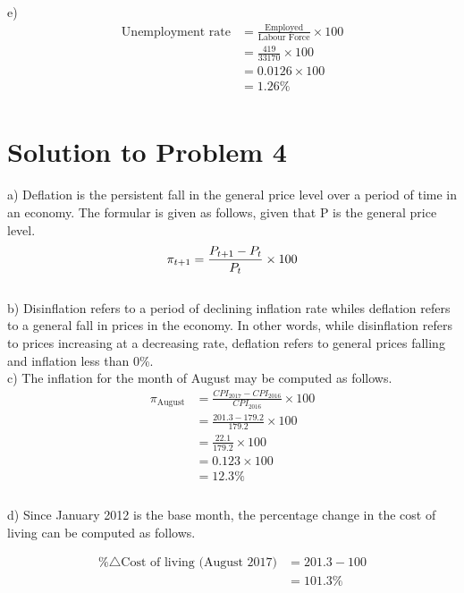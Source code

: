 \documentclass[12pt]{article}
\begin{document}
e) \begin{align*}
	\text{Unemployment rate} &= \frac{\text{Employed}}{\text{Labour Force}} \times 100\\
	&= \frac{419}{33170} \times 100\\ 
	&= 0.0126 \times 100\\
	&= 1.26\%\\
   \end{align*}

\section*{Solution to Problem 4}
a) Deflation is the persistent fall in the general price level over a period of time in an economy. The formular is given as follows, given that P is the general price level.
\begin{equation*}
	\pi_{t+1} = \frac{P_{t+1} - P_{t}}{P_{t}} \times 100\\
\end{equation*}
\\

b) Disinflation refers to a period of declining inflation rate whiles deflation refers to a general fall in prices in the economy. In other words, while disinflation refers to prices increasing at a decreasing rate, deflation refers to general prices falling and inflation less than 0\%.
\\

c) The inflation for the month of August may be computed as follows.
\begin{equation*}
	\begin{split}
		\pi_{\text{August}} &= \frac{CPI_{2017} - CPI_{2016}}{CPI_{2016}} \times 100\\
		&= \frac{201.3 - 179.2}{179.2} \times 100\\
		&= \frac{22.1}{179.2} \times 100\\
		&= 0.123 \times 100\\
		&= 12.3\%\\
	\end{split}
\end{equation*}\\

d) Since January 2012 is the base month, the percentage change in the cost of living can be computed as follows.

\begin{equation*}
	\begin{split}
	\%\triangle \text{Cost of living (August 2017)} &= 201.3 - 100\\
	&= 101.3\%\\
	\end{split}
\end{equation*}\\
\end{document}
